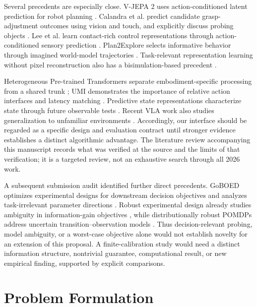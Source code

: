 \documentclass[11pt]{article}
\begin{document}
Several precedents are especially close. V-JEPA 2 uses action-conditioned latent prediction for robot planning \cite{vjepa2}. Calandra et al. predict candidate grasp-adjustment outcomes using vision and touch, and explicitly discuss probing objects \cite{calandra}. Lee et al. learn contact-rich control representations through action-conditioned sensory prediction \cite{lee}. Plan2Explore selects informative behavior through imagined world-model trajectories \cite{plan2explore}. Task-relevant representation learning without pixel reconstruction also has a bisimulation-based precedent \cite{bisim}.

Heterogeneous Pre-trained Transformers separate embodiment-specific processing from a shared trunk \cite{hpt}; UMI demonstrates the importance of relative action interfaces and latency matching \cite{umi}. Predictive state representations characterize state through future observable tests \cite{psr}. Recent VLA work also studies generalization to unfamiliar environments \cite{pi05}. Accordingly, our interface should be regarded as a specific design and evaluation contract until stronger evidence establishes a distinct algorithmic advantage. The literature review accompanying this manuscript records what was verified at the source and the limits of that verification; it is a targeted review, not an exhaustive search through all 2026 work.

A subsequent submission audit identified further direct precedents. GoBOED optimizes experimental designs for downstream decision objectives and analyzes task-irrelevant parameter directions \cite{goboed}. Robust experimental design already studies ambiguity in information-gain objectives \cite{robusteig}, while distributionally robust POMDPs address uncertain transition--observation models \cite{drpomdp}. Thus decision-relevant probing, model ambiguity, or a worst-case objective alone would not establish novelty for an extension of this proposal. A finite-calibration study would need a distinct information structure, nontrivial guarantee, computational result, or new empirical finding, supported by explicit comparisons.

\section{Problem Formulation}
\end{document}
